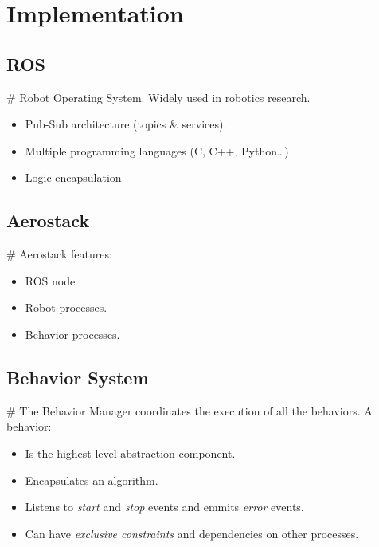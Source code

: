 \documentclass[]{beamer}
\def\mOrangeItem{\item[\textcolor{orange}{\textbullet}]}
\newcommand{\mSlideTitle}{{{\color{gray}\secname}} \# \subsecname}
\begin{document}
\section{Implementation}
\subsection{ROS}
\begin{frame}{\mSlideTitle}
  \alert{R}obot \alert{O}perating \alert{S}ystem. Widely used in robotics research.
  \begin{itemize}
    \mOrangeItem Pub-Sub architecture (topics \& services).
    \mOrangeItem Multiple programming languages (C, C++, Python\dots)
    \mOrangeItem Logic encapsulation
  \end{itemize}
\end{frame}


\subsection{Aerostack}
\begin{frame}{\mSlideTitle}
  Aerostack features:
  \begin{itemize}
    \mOrangeItem ROS node
    \mOrangeItem Robot processes.
    \mOrangeItem \alert{Behavior} processes.
  \end{itemize}
\end{frame}


\subsection{Behavior System}
\begin{frame}{\mSlideTitle}
  The Behavior Manager coordinates the execution of all the behaviors. A behavior:
  \begin{itemize}
    \mOrangeItem Is the highest level abstraction component.
    \mOrangeItem Encapsulates an algorithm.
    \mOrangeItem Listens to \emph{start} and \emph{stop} events and emmits \emph{error} events.
    \mOrangeItem Can have \emph{exclusive constraints} and dependencies on other processes.
  \end{itemize}
\end{frame}
\end{document}
